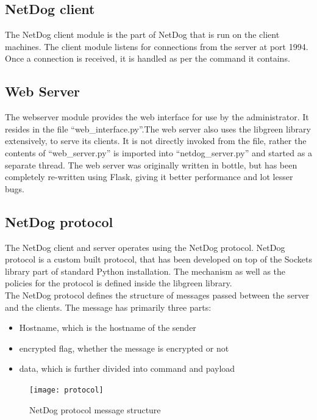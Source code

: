\subsection{NetDog client}
The NetDog client module is the part of NetDog that is run on the client
machines. The client module listens for connections from the server at port
1994. Once a connection is received, it is handled as per the command it
contains.

\subsection{Web Server}
The webserver module provides the web interface for use by the administrator.
It resides in the file ``web\_interface.py''.The web server also uses the
libgreen library extensively, to serve its clients. It is not directly invoked
from the file, rather the contents of ``web\_server.py'' is imported into
``netdog\_server.py'' and started as a separate thread. The web server was
originally written in bottle, but has been completely re-written using Flask,
giving it better performance and lot lesser bugs.

\subsection{NetDog protocol}
The NetDog client and server operates using the NetDog protocol. NetDog protocol
is a custom built protocol, that has been developed on top of the Sockets
library part of standard Python installation. The mechanism as well as the
policies for the protocol is defined inside the libgreen library.\\

The NetDog protocol defines the structure of messages passed between the server
and the clients. The message has primarily three parts:

\begin{itemize}
    \item Hostname, which is the hostname of the sender
    \item encrypted flag, whether the message is encrypted or not
    \item data, which is further divided into command and payload
\end{itemize}

\begin{figure}[H]
\centering
\texttt{[image: protocol]}
\caption{NetDog protocol message structure}
\end{figure}

